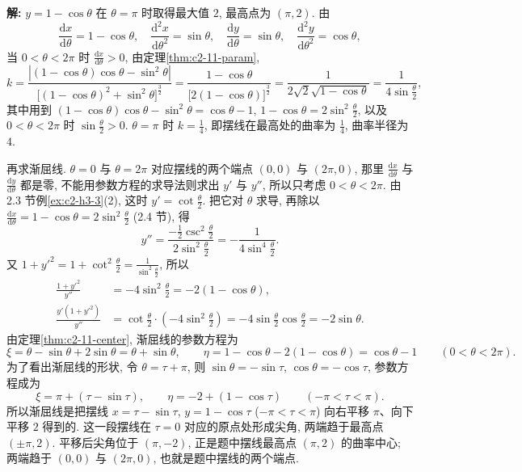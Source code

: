 \documentclass[UTF8,openany]{ctexbook}
\theoremstyle{chinesetextbook}
\newenvironment{cnsolution}{\par\indent\textbf{解:} \ignorespaces}{\par}
\newcommand{\dd}{\mathrm d}
\begin{document}
\begin{cnsolution}
$y=1-\cos\theta$ 在 $\theta=\pi$ 时取得最大值 $2$, 最高点为 $(\pi,2)$. 由
\[
\frac{\dd x}{\dd\theta}=1-\cos\theta,\quad\frac{\dd^2x}{\dd\theta^2}=\sin\theta,\quad\frac{\dd y}{\dd\theta}=\sin\theta,\quad\frac{\dd^2y}{\dd\theta^2}=\cos\theta,
\]
当 $0<\theta<2\pi$ 时 $\displaystyle\frac{\dd x}{\dd\theta}>0$, 由定理\ref{thm:c2-11-param},
\[
k=\frac{|(1-\cos\theta)\cos\theta-\sin^2\theta|}{\bigl[(1-\cos\theta)^2+\sin^2\theta\bigr]^{\frac32}}=\frac{1-\cos\theta}{\bigl[2(1-\cos\theta)\bigr]^{\frac32}}=\frac1{2\sqrt2\sqrt{1-\cos\theta}}=\frac1{4\sin\frac\theta2},
\]
其中用到 $(1-\cos\theta)\cos\theta-\sin^2\theta=\cos\theta-1$, $\displaystyle1-\cos\theta=2\sin^2\frac\theta2$, 以及 $0<\theta<2\pi$ 时 $\displaystyle\sin\frac\theta2>0$. $\theta=\pi$ 时 $\displaystyle k=\frac14$, 即摆线在最高处的曲率为 $\displaystyle\frac14$, 曲率半径为 $4$.

再求渐屈线. $\theta=0$ 与 $\theta=2\pi$ 对应摆线的两个端点 $(0,0)$ 与 $(2\pi,0)$, 那里 $\displaystyle\frac{\dd x}{\dd\theta}$ 与 $\displaystyle\frac{\dd y}{\dd\theta}$ 都是零, 不能用参数方程的求导法则求出 $y'$ 与 $y''$, 所以只考虑 $0<\theta<2\pi$. 由 2.3 节例\ref{ex:c2-h3-3}(2), 这时 $\displaystyle y'=\cot\frac\theta2$. 把它对 $\theta$ 求导, 再除以 $\displaystyle\frac{\dd x}{\dd\theta}=1-\cos\theta=2\sin^2\frac\theta2$ (2.4 节), 得
\[
y''=\frac{-\frac12\csc^2\frac\theta2}{2\sin^2\frac\theta2}=-\frac1{4\sin^4\frac\theta2}.
\]
又 $\displaystyle1+y'^2=1+\cot^2\frac\theta2=\frac1{\sin^2\frac\theta2}$, 所以
\[
\begin{aligned}
\frac{1+y'^2}{y''}&=-4\sin^2\frac\theta2=-2(1-\cos\theta),\\
\frac{y'(1+y'^2)}{y''}&=\cot\frac\theta2\cdot\left(-4\sin^2\frac\theta2\right)=-4\sin\frac\theta2\cos\frac\theta2=-2\sin\theta.
\end{aligned}
\]
由定理\ref{thm:c2-11-center}, 渐屈线的参数方程为
\[
\xi=\theta-\sin\theta+2\sin\theta=\theta+\sin\theta,\qquad\eta=1-\cos\theta-2(1-\cos\theta)=\cos\theta-1\qquad(0<\theta<2\pi).
\]
为了看出渐屈线的形状, 令 $\theta=\tau+\pi$, 则 $\sin\theta=-\sin\tau$, $\cos\theta=-\cos\tau$, 参数方程成为
\[
\xi=\pi+(\tau-\sin\tau),\qquad\eta=-2+(1-\cos\tau)\qquad(-\pi<\tau<\pi).
\]
所以渐屈线是把摆线 $x=\tau-\sin\tau$, $y=1-\cos\tau$ ($-\pi<\tau<\pi$) 向右平移 $\pi$、向下平移 $2$ 得到的. 这一段摆线在 $\tau=0$ 对应的原点处形成尖角, 两端趋于最高点 $(\pm\pi,2)$. 平移后尖角位于 $(\pi,-2)$, 正是题中摆线最高点 $(\pi,2)$ 的曲率中心; 两端趋于 $(0,0)$ 与 $(2\pi,0)$, 也就是题中摆线的两个端点.
\end{cnsolution}
\end{document}
